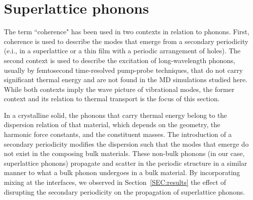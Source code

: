 \documentclass[aps,prb,preprint,preprintnumbers,amsmath,amssymb,floatfix,superscriptaddress]{revtex4}
\begin{document}
\begin{comment}
The noise in the contribution distribution at longer MFPs is consequence of the limited resolution of the Brouillin zone enforced by the MD domain. This has been observed in other mode by mode analysis techniques, such as the real space force constant extraction from DFT method used by Esfarjani, where the limited resolution manifested in a stepwise behavior of thermal conductivity accumulation function of bulk silicon. \cite{PhysRevB.84.085204} The linear behavior of the dispersion near the gamma point of the Brouillin zone and the $\omega^{-2}$ scaling of the lifetimes allowed for the contribution of these unresolved long-wavelength modes to be estimated. The linear extrapolation procedure used to predict bulk thermal conductivities \cite{PhysRevB.81.214305} was not used in previous superlattice studies \cite{doi:10.1021/nl202186y,Luckyanova16112012} and is not used here. The complicated dispersion [Fig.~\ref{fig:dispersion}(a-c)] does not guarantee that such an approach is viable, as such, understanding size effects in superlattices warrants further work.
\end{comment}

\section{Superlattice phonons}\label{SEC:sl_phon}

The term ``coherence" has been used in two contexts in relation to phonons. First, coherence is used to describe the modes that emerge from a secondary periodicity (e.i., in a superlattice or a thin film with a periodic arrangement of holes\cite{doi:10.1021/nl102918q,PhysRevB.87.195301}). The second context is used to describe the excitation of long-wavelength phonons, usually by femtosecond time-resolved pump-probe techniques,\cite{PhysRevLett.73.740,PhysRevB.75.195309} that do not carry significant thermal energy and are not found in the MD simulations studied here. While both contexts imply the wave picture of vibrational modes, the former context and its relation to thermal transport is the focus of this section.

In a crystalline solid, the phonons that carry thermal energy belong to the dispersion relation of that material, which depends on the geometry, the harmonic force constants, and the constituent masses. The introduction of a secondary periodicity modifies the dispersion such that the modes that emerge do not exist in the composing bulk materials. These non-bulk phonons (in our case, superlattice phonons) propagate and scatter in the periodic structure in a similar manner to what a bulk phonon undergoes in a bulk material. By incorporating mixing at the interfaces, we observed in Section~\ref{SEC:results} the effect of disrupting the secondary periodicity on the propagation of superlattice phonons. %
\end{document}
